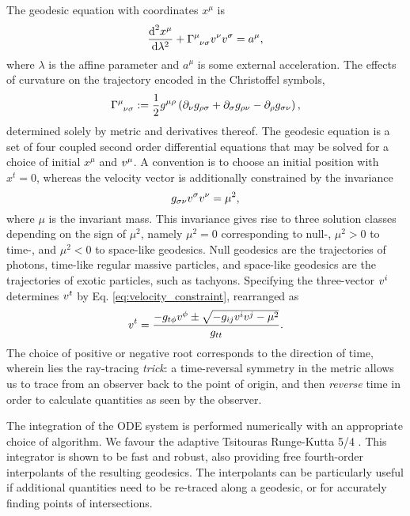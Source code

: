 The geodesic equation with coordinates $x^\mu$ is
\begin{equation}
\label{eq:geodesic_equation}
    \frac{\d^2 x^\mu}{\d \lambda^2}
    + \utensor{\Gamma}{\mu}{\nu\sigma}
    \vel{\nu}
    \vel{\sigma}
    = a^\mu,
\end{equation}
where $\lambda$ is the affine parameter and $a^\mu$ is some external acceleration. The effects of curvature on the trajectory encoded in the Christoffel symbols, 
\begin{equation}
\label{eq:christoffel}
    \utensor{\Gamma}{\mu}{\nu\sigma}
    := \frac{1}{2} g^{\mu\rho} 
    \left(
        \partial_{\nu}g_{\rho \sigma}
        + \partial_{\sigma}g_{\rho \nu}
        - \partial_{\rho}g_{\sigma \nu}
    \right),
\end{equation}
determined solely by metric and derivatives thereof. The geodesic equation is a set of four coupled second order differential equations that may be solved for a choice of initial $x^\mu$ and $v^{\mu}$. A convention is to choose an initial position with $x^t = 0$, whereas the velocity vector is additionally constrained by the invariance
\begin{equation}
\label{eq:velocity_constraint}
    g_{\sigma\nu} v^{\sigma} v^{\nu} = \mu^2,
\end{equation}
where $\mu$ is the invariant mass. This invariance gives rise to three solution classes depending on the sign of $\mu^2$, namely $\mu^2 = 0$ corresponding to null-, $\mu^2 > 0$ to time-, and $\mu^2 < 0$ to space-like geodesics. Null geodesics are the trajectories of photons, time-like regular massive particles, and space-like geodesics are the trajectories of exotic particles, such as tachyons. Specifying the three-vector $v^{i}$ determines $v^{t}$ by Eq. \eqref{eq:velocity_constraint}, rearranged as
\begin{equation}
v^{t}  = \frac{-g_{t\phi} v^{\phi} \pm
    \sqrt{-g_{ij} v^{i} v^{j} - \mu^2}
}{g_{tt}}.
\end{equation}
The choice of positive or negative root corresponds to the direction of time, wherein lies the ray-tracing \textit{trick}: a time-reversal symmetry in the metric allows us to trace from an observer back to the point of origin, and then \textit{reverse} time in order to calculate quantities as seen by the observer. 

The integration of the ODE system is performed numerically with an appropriate choice of algorithm. We favour the adaptive Tsitouras Runge-Kutta 5/4 \citep{tsitouras_rungekutta_2011}. This integrator is shown to be fast and robust, also providing free fourth-order interpolants of the resulting geodesics. The interpolants can be particularly useful if additional quantities need to be re-traced along a geodesic, or for accurately finding points of intersections.

